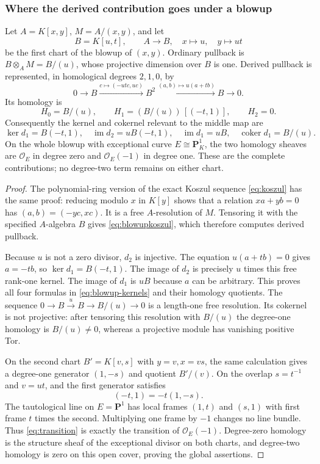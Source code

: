 \subsubsection{Where the derived contribution goes under a blowup}

\begin{theorem}\label{thm:blowup}
Let $A=K[x,y]$, $M=A/(x,y)$, and let
\[
 B=K[u,t],\qquad A\longrightarrow B,\quad x\longmapsto u,
 \quad y\longmapsto ut
 \tag{AV7.4}\label{eq:blowupchart}
\]
be the first chart of the blowup of $(x,y)$. Ordinary pullback is
$B\otimes_A M=B/(u)$, whose projective dimension over $B$ is one.
Derived pullback is represented, in homological degrees $2,1,0$, by
\[
 0\longrightarrow B\xrightarrow{c\mapsto(-ut c,uc)}B^2
 \xrightarrow{(a,b)\mapsto u(a+tb)}B\longrightarrow0.
 \tag{AV7.5}\label{eq:blowupkoszul}
\]
Its homology is
\[
 H_0=B/(u),\qquad
 H_1=(B/(u))\,[(-t,1)],\qquad H_2=0.
 \tag{AV7.6}\label{eq:blowuphomology}
\]
Consequently the kernel and cokernel relevant to the middle map are
\[
 \ker d_1=B(-t,1),\quad \operatorname{im}d_2=uB(-t,1),\quad
 \operatorname{im}d_1=uB,\quad\operatorname{coker}d_1=B/(u).
 \tag{AV7.7}\label{eq:blowup-kernels}
\]
On the whole blowup with exceptional curve $E\cong\mathbf P^1_K$, the
two homology sheaves are $\mathcal O_E$ in degree zero and
$\mathcal O_E(-1)$ in degree one. These are the complete contributions;
no degree-two term remains on either chart.
\end{theorem}
\begin{proof}
The polynomial-ring version of the exact Koszul sequence
\eqref{eq:koszul} has the same proof: reducing modulo $x$ in $K[y]$
shows that a relation $xa+yb=0$ has $(a,b)=(-yc,xc)$. It is a free
$A$-resolution of $M$. Tensoring it with the specified $A$-algebra $B$
gives \eqref{eq:blowupkoszul}, which therefore computes derived pullback.

Because $u$ is not a zero divisor, $d_2$ is injective. The equation
$u(a+tb)=0$ gives $a=-tb$, so $\ker d_1=B(-t,1)$. The image of $d_2$
is precisely $u$ times this free rank-one kernel. The image of $d_1$
is $uB$ because $a$ can be arbitrary. This proves all four formulas
in \eqref{eq:blowup-kernels} and their homology quotients.
The sequence $0\to B\xrightarrow{u}B\to B/(u)\to0$ is a length-one
free resolution. Its cokernel is not projective: after tensoring this
resolution with $B/(u)$ the degree-one homology is $B/(u)\ne0$,
whereas a projective module has vanishing positive Tor.

On the second chart $B'=K[v,s]$ with $y=v,x=vs$, the same calculation
gives a degree-one generator $(1,-s)$ and quotient $B'/(v)$.
On the overlap $s=t^{-1}$ and $v=ut$, and the first generator satisfies
\[
 (-t,1)=-t(1,-s).
 \tag{AV7.8}\label{eq:transition}
\]
The tautological line on $E=\mathbf P^1$ has local frames $(1,t)$ and
$(s,1)$ with first frame $t$ times the second. Multiplying one frame
by $-1$ changes no line bundle. Thus \eqref{eq:transition} is exactly
the transition of $\mathcal O_E(-1)$. Degree-zero homology is the
structure sheaf of the exceptional divisor on both charts, and
degree-two homology is zero on this open cover, proving the global
assertions.
\end{proof}

